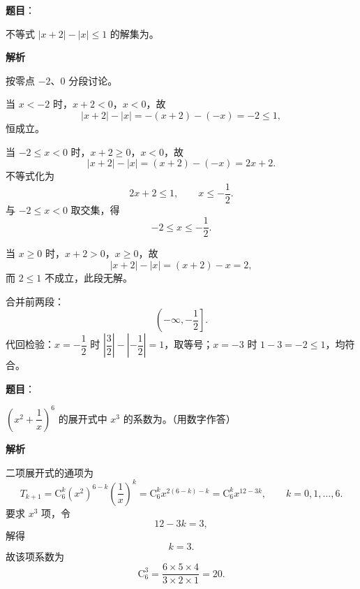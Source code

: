 \begin{answer}

\textbf{题目}：

不等式 $|x+2|-|x|\leqslant 1$ 的解集为\gkblank{}。

\textbf{解析}

按零点 $-2$、$0$ 分段讨论。

当 $x<-2$ 时，$x+2<0$，$x<0$，故
\nopagebreak[4]
\[|x+2|-|x|=-(x+2)-(-x)=-2\leqslant1,\]
恒成立。

当 $-2\leqslant x<0$ 时，$x+2\geqslant0$，$x<0$，故
\nopagebreak[4]
\[|x+2|-|x|=(x+2)-(-x)=2x+2.\]
不等式化为
\nopagebreak[4]
\[2x+2\leqslant1,\qquad x\leqslant-\frac12.\]
与 $-2\leqslant x<0$ 取交集，得
\nopagebreak[4]
\[-2\leqslant x\leqslant-\frac12.\]

当 $x\geqslant0$ 时，$x+2>0$，$x\geqslant0$，故
\nopagebreak[4]
\[|x+2|-|x|=(x+2)-x=2,\]
而 $2\leqslant1$ 不成立，此段无解。

合并前两段：
\nopagebreak[4]
\[\left(-\infty,-\frac12\right].\]
代回检验：$x=-\dfrac12$ 时 $\left|\dfrac32\right|-\left|-\dfrac12\right|=1$，取等号；$x=-3$ 时 $1-3=-2\leqslant1$，均符合。

\gkanswer{答案：$\left(-\infty,-\dfrac12\right]$。分 $x<-2$、$-2\leqslant x<0$、$x\geqslant0$ 三段讨论，仅前两段的部分满足。}

\end{answer}
\begin{answer}

\textbf{题目}：

$\left(x^2+\dfrac1x\right)^6$ 的展开式中 $x^3$ 的系数为\gkblank{}。（用数字作答）

\textbf{解析}

二项展开式的通项为
\nopagebreak[4]
\[T_{k+1}=\mathrm C_6^k\left(x^2\right)^{6-k}\left(\frac1x\right)^k
=\mathrm C_6^k x^{2(6-k)-k}
=\mathrm C_6^k x^{12-3k},\qquad k=0,1,\ldots,6.\]
要求 $x^3$ 项，令
\nopagebreak[4]
\[12-3k=3,\]
解得
\nopagebreak[4]
\[k=3.\]
故该项系数为
\nopagebreak[4]
\[\mathrm C_6^3=\frac{6\times5\times4}{3\times2\times1}=20.\]


\end{answer}
